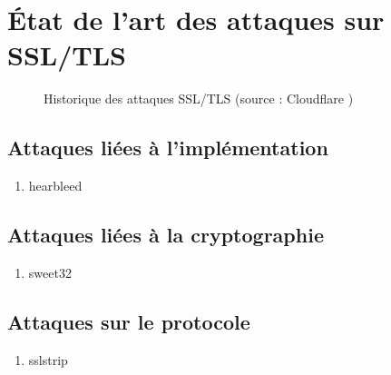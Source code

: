 \chapter{État de l'art des attaques sur SSL/TLS}

\begin{figure}[H]
  \caption{Historique des attaques SSL/TLS (source : Cloudflare \cite{cloudflare})}
\end{figure}

\section{Attaques liées à l'implémentation}

\begin{enumerate}
\item hearbleed
\end{enumerate}

\section{Attaques liées à la cryptographie}

\begin{enumerate}
\item sweet32
\end{enumerate}

\section{Attaques sur le protocole}

\begin{enumerate}
\item sslstrip
\end{enumerate}
